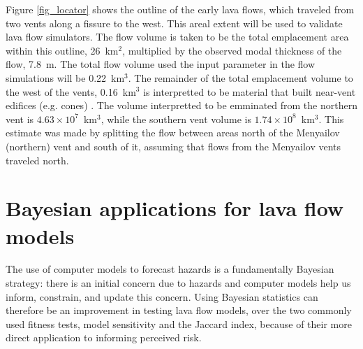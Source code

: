 Figure \ref{fig_locator} shows the outline of the early lava flows, which traveled from two vents along a fissure to the west. This areal extent will be used to validate lava flow simulators. The flow volume is taken to be the total emplacement area within this outline, 26~km$^2$, multiplied by the observed modal thickness of the flow, 7.8~m. The total flow volume used the input parameter in the flow simulations will be 0.22~km$^3$. The remainder of the total emplacement volume to the west of the vents, 0.16~km$^3$ is interpretted to be material that built near-vent edifices (e.g. cones) \citep{kubanek2015lava}. The volume interpretted to be emminated from the northern vent is $4.63\times 10^7$~km$^3$, while the southern vent volume is $1.74\times 10^8$~km$^3$. This estimate was made by splitting the flow between areas north of the Menyailov (northern) vent and south of it, assuming that flows from the Menyailov vents traveled north.
	











\section{Bayesian applications for lava flow models}\label{sec:Bayesian}

	The use of computer models to forecast hazards is a fundamentally Bayesian strategy: there is an initial concern due to hazards and computer models help us inform, constrain, and update this concern. Using Bayesian statistics can therefore be an improvement in testing lava flow models, over the two commonly used fitness tests, model sensitivity and the Jaccard index, because of their more direct application to informing perceived risk. 
	
